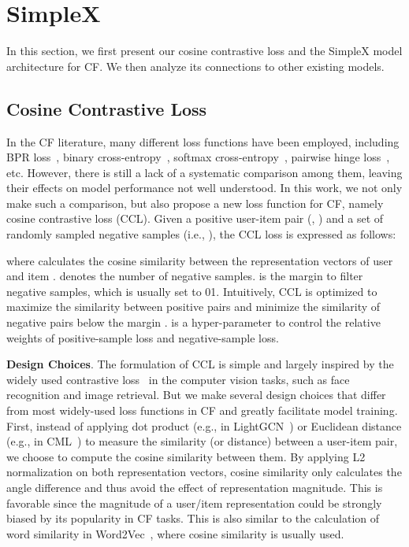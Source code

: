 \documentclass[sigconf,authorversion]{acmart}
\begin{document}
    




 \section{SimpleX}\label{sec:approach}
In this section, we first present our cosine contrastive loss and the SimpleX model architecture for CF. We then analyze its connections to other existing models.

\subsection{Cosine Contrastive Loss}
\label{approach:MF-CCL}

In the CF literature, many different loss functions have been employed, including BPR loss~\cite{BPR}, binary cross-entropy~\cite{NeuMF}, softmax cross-entropy~\cite{YouTubeNet}, pairwise hinge loss~\cite{CML}, etc. However, there is still a lack of a systematic comparison among them, leaving their effects on model performance not well understood. In this work, we not only make such a comparison, but also propose a new loss function for CF, namely cosine contrastive loss (CCL). Given a positive user-item pair (, ) and a set of randomly sampled negative samples (i.e., ), the CCL loss is expressed as follows:

where  calculates the cosine similarity between the representation vectors of user  and item .  denotes the number of negative samples.  is the margin to filter negative samples, which is usually set to 01. Intuitively, CCL is optimized to maximize the similarity between positive pairs and minimize the similarity of negative pairs below the margin .  is a hyper-parameter to control the relative weights of positive-sample loss and negative-sample loss. 

\textbf{Design Choices}. 
The formulation of CCL is simple and largely inspired by the widely used contrastive loss~\cite{ContrastiveLoss1,ContrastiveLoss2} in the computer vision tasks, such as face recognition and image retrieval. But we make several design choices that differ from most widely-used loss functions in CF and greatly facilitate model training. First, instead of applying dot product (e.g., in LightGCN~\cite{LightGCN}) or Euclidean distance (e.g., in CML~\cite{CML}) to measure the similarity (or distance) between a user-item pair, we choose to compute the cosine similarity between them. By applying L2 normalization on both representation vectors, cosine similarity only calculates the angle difference and thus 
avoid the effect of representation magnitude. This is favorable since the magnitude of a user/item representation could be strongly biased by its popularity in CF tasks. This is also similar to the calculation of word similarity in Word2Vec~\cite{word2vec}, where cosine similarity is usually used.
\end{document}
